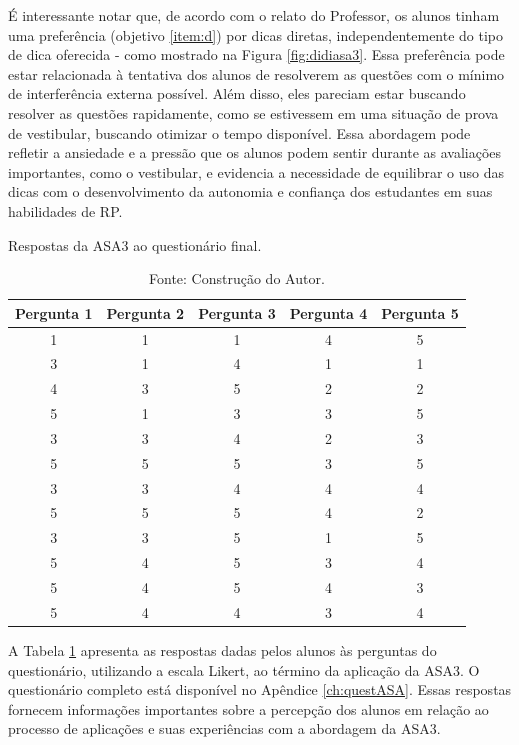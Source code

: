 É interessante notar que, de acordo com o relato do Professor, os alunos tinham uma preferência (objetivo \ref{item:d}) por dicas diretas, independentemente do tipo de dica oferecida - como mostrado na Figura \ref{fig:didiasa3}. Essa preferência pode estar relacionada à tentativa dos alunos de resolverem as questões com o mínimo de interferência externa possível. Além disso, eles pareciam estar buscando resolver as questões rapidamente, como se estivessem em uma situação de prova de vestibular, buscando otimizar o tempo disponível. Essa abordagem pode refletir a ansiedade e a pressão que os alunos podem sentir durante as avaliações importantes, como o vestibular, e evidencia a necessidade de equilibrar o uso das dicas com o desenvolvimento da autonomia e confiança dos estudantes em suas habilidades de RP.

\begin{table}[ht]
    \centering
    \caption{Respostas da ASA3 ao questionário final.}\label{tab:questASA3}
    \begin{tabular}{ccccc}
    \hline
       \textbf{Pergunta 1} & \textbf{Pergunta 2} & \textbf{Pergunta 3} & \textbf{Pergunta 4} & \textbf{Pergunta 5} \\ \hline
        1 & 1 & 1 & 4 & 5 \\ 
        3 & 1 & 4 & 1 & 1 \\ 
        4 & 3 & 5 & 2 & 2 \\ 
        5 & 1 & 3 & 3 & 5 \\ 
        3 & 3 & 4 & 2 & 3 \\ 
        5 & 5 & 5 & 3 & 5 \\ 
        3 & 3 & 4 & 4 & 4 \\ 
        5 & 5 & 5 & 4 & 2 \\ 
        3 & 3 & 5 & 1 & 5 \\ 
        5 & 4 & 5 & 3 & 4 \\ 
        5 & 4 & 5 & 4 & 3 \\ 
        5 & 4 & 4 & 3 & 4 \\ \hline
    \end{tabular}
    \caption*{Fonte: Construção do Autor.}
\end{table}

A Tabela \ref{tab:questASA3} apresenta as respostas dadas pelos alunos às perguntas do questionário, utilizando a escala Likert, ao término da aplicação da ASA3. O questionário completo está disponível no Apêndice \ref{ch:questASA}. Essas respostas fornecem informações importantes sobre a percepção dos alunos em relação ao processo de aplicações e suas experiências com a abordagem da ASA3.


